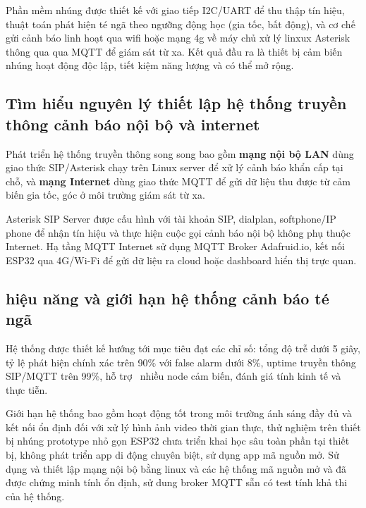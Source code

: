 Phần mềm nhúng được thiết kế với giao tiếp I2C/UART để thu thập tín hiệu, thuật toán phát hiện té ngã theo ngưỡng động học (gia tốc, bất động), và cơ chế gửi cảnh báo linh hoạt qua wifi hoặc mạng 4g về máy chủ xử lý linxux Asterisk thông qua qua MQTT để giám sát từ xa. Kết quả đầu ra là thiết bị cảm biến nhúng hoạt động độc lập, tiết kiệm năng lượng và có thể mở rộng.

\subsection{Tìm hiểu nguyên lý thiết lập hệ thống truyền thông cảnh báo nội bộ và internet}

Phát triển hệ thống truyền thông song song bao gồm \textbf{mạng nội bộ LAN} dùng giao thức SIP/Asterisk chạy trên Linux server để xử lý cảnh báo khẩn cấp tại chỗ, và \textbf{mạng Internet} dùng giao thức MQTT để gửi dữ liệu thu được từ cảm biến gia tốc, góc ở môi trường giám sát từ xa.

Asterisk SIP Server được cấu hình với tài khoản SIP, dialplan, softphone/IP phone để nhận tín hiệu và thực hiện cuộc gọi cảnh báo nội bộ không phụ thuộc Internet. Hạ tầng MQTT Internet sử dụng MQTT Broker Adafruid.io, kết nối ESP32 qua 4G/Wi-Fi để gửi dữ liệu ra cloud hoặc dashboard hiển thị trực quan.


\subsection{hiệu năng và giới hạn hệ thống cảnh báo té ngã}

Hệ thống được thiết kế hướng tới mục tiêu đạt các chỉ số: tổng độ trễ dưới 5 giây, tỷ lệ phát hiện chính xác trên 90\% với false alarm dưới 8\%, uptime truyền thông SIP/MQTT trên 99\%, hỗ trợ  nhiều node cảm biến, đánh giá tính kinh tế và thực tiễn.

Giới hạn hệ thống bao gồm hoạt động tốt trong môi trường ánh sáng đầy đủ và kết nối ổn định đối với xử lý hình ảnh video thời gian thực, thử nghiệm trên thiết bị nhúng prototype nhỏ gọn ESP32 chưa triển khai học sâu toàn phần tại thiết bị, không phát triển app di động chuyên biệt, sử dụng app mã nguồn mở. Sử dụng và thiết lập mạng nội bộ bằng linux và các hệ thống mã nguồn mở và đã được chứng minh tính ổn định, sử dung broker MQTT sẵn có test tính khả thi của hệ thống.
